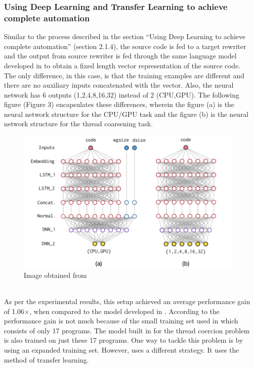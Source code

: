 \documentclass[a4paper,11pt]{article}
\begin{document}
  \subsubsection{Using Deep Learning  and Transfer Learning to achieve complete automation}
  \indent\indent Similar to the process described in the section ``Using Deep Learning to achieve complete automation'' (section 2.1.4), the source code is fed to a target rewriter and the output from source rewriter is fed through the same language model developed in \cite{first} to obtain a fixed length vector representation of the source code. The only difference, in this case, is that the training examples are different and there are no auxiliary inputs concatenated with the vector. Also, the neural network has 6 outputs (1,2,4,8,16,32) instead of 2 (CPU,GPU). The following figure (Figure 3) encapsulates these differences, wherein the figure (a) is the neural network structure for the CPU/GPU task and the figure (b) is the neural network structure for the thread coarsening task.
      \begin{figure}[h]
  	\caption{Image obtained from \cite{first}}
  	\begin{center}
  		\includegraphics[scale = 0.6]{Neural_a.png}
  	\end{center}
  \end{figure}\\
  \indent As per the experimental results, this setup achieved an average performance gain of 1.06$\times$, when compared to the  model developed in \cite{threadautomatic}. According to \cite{first} the performance gain is not much because of the small training set used in \cite{threadautomatic} which consists of only 17 programs. The model built in \cite{first} for the thread coercion problem is also trained on just these 17 programs. One way to tackle this problem is by using an expanded training set. However, \cite{first} uses a different strategy. It uses the method of transfer learning.\\
\end{document}
